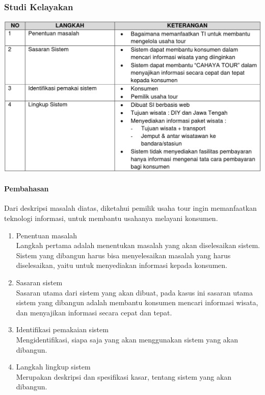 \documentclass[a4paper,12pt]{article}
\begin{document}
\subsubsection{Studi Kelayakan}
\begin{center}
    \includegraphics[width=\textwidth]{tabel1.png} 
\end{center}
\paragraph*{Pembahasan\\}
Dari deskripsi masalah diatas, diketahui pemilik usaha tour ingin memanfaatkan teknologi informasi, untuk
membantu usahanya melayani konsumen.
\begin{enumerate}
    \item Penentuan masalah\\
        Langkah pertama adalah menentukan masalah yang akan diselesaikan sistem. Sistem yang dibangun harus bisa
        menyelesaikan masalah yang harus diselesaikan, yaitu untuk menyediakan informasi kepada konsumen.

    \item Sasaran sistem\\
        Sasaran utama dari sistem yang akan dibuat, pada kasus ini sasaran utama sistem yang dibangun adalah
        membantu konsumen mencari informasi wisata, dan menyajikan informasi secara cepat dan tepat.

    \item Identifikasi pemakaian sistem\\
        Mengidentifikasi, siapa saja yang akan menggunakan sistem yang akan dibangun.

    \item Langkah lingkup sistem\\
        Merupakan deskripsi dan spesifikasi kasar, tentang sistem yang akan dibangun.
\end{enumerate}
\end{document}
